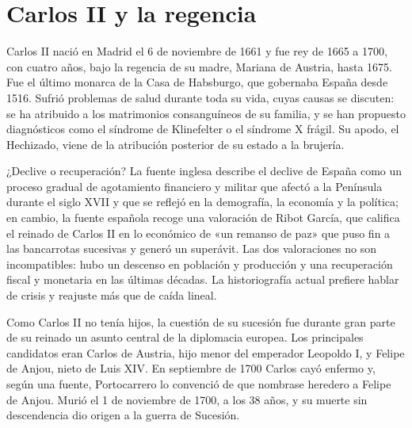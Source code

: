\documentclass{book}
\begin{document}
\par\vspace{\baselineskip}

\section{Carlos II y la regencia}

Carlos II nació en Madrid el 6 de noviembre de 1661 y fue rey de 1665 a 1700, con cuatro años, bajo la regencia de su madre, Mariana de Austria, hasta 1675. Fue el último monarca de la Casa de Habsburgo, que gobernaba España desde 1516. Sufrió problemas de salud durante toda su vida, cuyas causas se discuten: se ha atribuido a los matrimonios consanguíneos de su familia, y se han propuesto diagnósticos como el síndrome de Klinefelter o el síndrome X frágil. Su apodo, el Hechizado, viene de la atribución posterior de su estado a la brujería.


¿Declive o recuperación?
La fuente inglesa describe el declive de España como un proceso gradual de agotamiento financiero y militar que afectó a la Península durante el siglo XVII y que se reflejó en la demografía, la economía y la política; en cambio, la fuente española recoge una valoración de Ribot García, que califica el reinado de Carlos II en lo económico de «un remanso de paz» que puso fin a las bancarrotas sucesivas y generó un superávit. Las dos valoraciones no son incompatibles: hubo un descenso en población y producción y una recuperación fiscal y monetaria en las últimas décadas. La historiografía actual prefiere hablar de crisis y reajuste más que de caída lineal.


Como Carlos II no tenía hijos, la cuestión de su sucesión fue durante gran parte de su reinado un asunto central de la diplomacia europea. Los principales candidatos eran Carlos de Austria, hijo menor del emperador Leopoldo I, y Felipe de Anjou, nieto de Luis XIV. En septiembre de 1700 Carlos cayó enfermo y, según una fuente, Portocarrero lo convenció de que nombrase heredero a Felipe de Anjou. Murió el 1 de noviembre de 1700, a los 38 años, y su muerte sin descendencia dio origen a la guerra de Sucesión.
\end{document}

